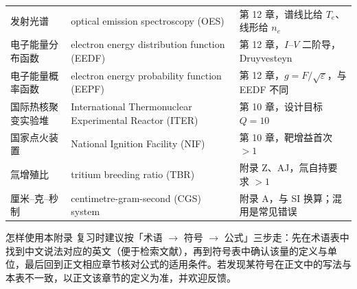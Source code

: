\documentclass[12pt,a4paper,openany,oneside]{book}
\begin{document}
{\begin{longtable}{@{}p{4.2cm}p{5.6cm}p{4.8cm}@{}}
发射光谱 & optical emission spectroscopy (OES) & 第 12 章，谱线比给 $T_e$、线形给 $n_e$ \\
电子能量分布函数 & electron energy distribution function (EEDF) & 第 12 章，$I$--$V$ 二阶导，Druyvesteyn \\
电子能量概率函数 & electron energy probability function (EEPF) & 第 12 章，$g=F/\sqrt{\varepsilon}$，与 EEDF 不同 \\
国际热核聚变实验堆 & International Thermonuclear Experimental Reactor (ITER) & 第 10 章，设计目标 $Q=10$ \\
国家点火装置 & National Ignition Facility (NIF) & 第 10 章，靶增益首次 $>1$ \\
氚增殖比 & tritium breeding ratio (TBR) & 附录 Z、AJ，氚自持要求 $>1$ \\
厘米--克--秒制 & centimetre-gram-second (CGS) system & 附录 A，与 SI 换算；混用是常见错误 \\
\end{longtable}
}

\begin{insight}{怎样使用本附录}{}
复习时建议按「术语 $\to$ 符号 $\to$ 公式」三步走：先在术语表中找到中文说法对应的英文（便于检索文献），再到符号表中确认该量的定义与单位，最后回到正文相应章节核对公式的适用条件。若发现某符号在正文中的写法与本表不一致，以正文该章节的定义为准，并欢迎反馈。
\end{insight}
\end{document}
